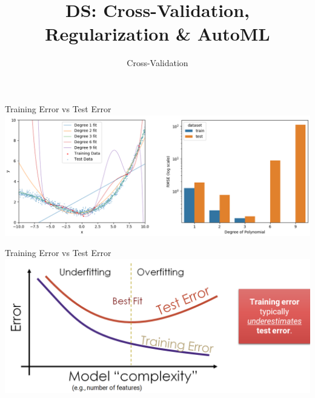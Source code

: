 \documentclass[aspectratio=169]{../latex_main/tntbeamer}  %
\title[CV, Reg \& AutoML]{DS: Cross-Validation, Regularization \& AutoML}
\subtitle{Cross-Validation}
\begin{document}
	
	\maketitle
	\begin{frame}{Training Error vs Test Error}
	    \includegraphics[scale=.4]{Bild1}
	\end{frame}
	
	
	\begin{frame}{Training Error vs Test Error}
	    \includegraphics[scale=.4]{Bild2}
	\end{frame}
	
\end{document}

